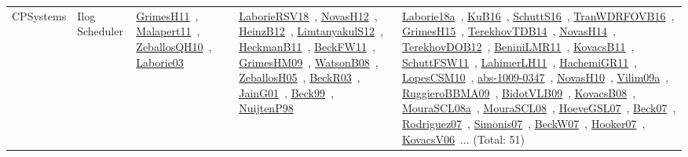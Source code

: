 {\begin{longtable}{lp{3cm}>{\raggedright\arraybackslash}p{6cm}>{\raggedright\arraybackslash}p{6cm}>{\raggedright\arraybackslash}p{8cm}}
CPSystems & Ilog Scheduler & \href{works/GrimesH11.pdf}{GrimesH11}~\cite{GrimesH11}, \href{works/Malapert11.pdf}{Malapert11}~\cite{Malapert11}, \href{works/ZeballosQH10.pdf}{ZeballosQH10}~\cite{ZeballosQH10}, \href{works/Laborie03.pdf}{Laborie03}~\cite{Laborie03} & \href{works/LaborieRSV18.pdf}{LaborieRSV18}~\cite{LaborieRSV18}, \href{works/NovasH12.pdf}{NovasH12}~\cite{NovasH12}, \href{works/HeinzB12.pdf}{HeinzB12}~\cite{HeinzB12}, \href{works/LimtanyakulS12.pdf}{LimtanyakulS12}~\cite{LimtanyakulS12}, \href{works/HeckmanB11.pdf}{HeckmanB11}~\cite{HeckmanB11}, \href{works/BeckFW11.pdf}{BeckFW11}~\cite{BeckFW11}, \href{works/GrimesHM09.pdf}{GrimesHM09}~\cite{GrimesHM09}, \href{works/WatsonB08.pdf}{WatsonB08}~\cite{WatsonB08}, \href{works/ZeballosH05.pdf}{ZeballosH05}~\cite{ZeballosH05}, \href{works/BeckR03.pdf}{BeckR03}~\cite{BeckR03}, \href{works/JainG01.pdf}{JainG01}~\cite{JainG01}, \href{works/Beck99.pdf}{Beck99}~\cite{Beck99}, \href{works/NuijtenP98.pdf}{NuijtenP98}~\cite{NuijtenP98} & \href{works/Laborie18a.pdf}{Laborie18a}~\cite{Laborie18a}, \href{works/KuB16.pdf}{KuB16}~\cite{KuB16}, \href{works/SchuttS16.pdf}{SchuttS16}~\cite{SchuttS16}, \href{works/TranWDRFOVB16.pdf}{TranWDRFOVB16}~\cite{TranWDRFOVB16}, \href{works/GrimesH15.pdf}{GrimesH15}~\cite{GrimesH15}, \href{works/TerekhovTDB14.pdf}{TerekhovTDB14}~\cite{TerekhovTDB14}, \href{works/NovasH14.pdf}{NovasH14}~\cite{NovasH14}, \href{works/TerekhovDOB12.pdf}{TerekhovDOB12}~\cite{TerekhovDOB12}, \href{works/BeniniLMR11.pdf}{BeniniLMR11}~\cite{BeniniLMR11}, \href{works/KovacsB11.pdf}{KovacsB11}~\cite{KovacsB11}, \href{works/SchuttFSW11.pdf}{SchuttFSW11}~\cite{SchuttFSW11}, \href{works/LahimerLH11.pdf}{LahimerLH11}~\cite{LahimerLH11}, \href{works/HachemiGR11.pdf}{HachemiGR11}~\cite{HachemiGR11}, \href{works/LopesCSM10.pdf}{LopesCSM10}~\cite{LopesCSM10}, \href{works/abs-1009-0347.pdf}{abs-1009-0347}~\cite{abs-1009-0347}, \href{works/NovasH10.pdf}{NovasH10}~\cite{NovasH10}, \href{works/Vilim09a.pdf}{Vilim09a}~\cite{Vilim09a}, \href{works/RuggieroBBMA09.pdf}{RuggieroBBMA09}~\cite{RuggieroBBMA09}, \href{works/BidotVLB09.pdf}{BidotVLB09}~\cite{BidotVLB09}, \href{works/KovacsB08.pdf}{KovacsB08}~\cite{KovacsB08}, \href{works/MouraSCL08a.pdf}{MouraSCL08a}~\cite{MouraSCL08a}, \href{works/MouraSCL08.pdf}{MouraSCL08}~\cite{MouraSCL08}, \href{works/HoeveGSL07.pdf}{HoeveGSL07}~\cite{HoeveGSL07}, \href{works/Beck07.pdf}{Beck07}~\cite{Beck07}, \href{works/Rodriguez07.pdf}{Rodriguez07}~\cite{Rodriguez07}, \href{works/Simonis07.pdf}{Simonis07}~\cite{Simonis07}, \href{works/BeckW07.pdf}{BeckW07}~\cite{BeckW07}, \href{works/Hooker07.pdf}{Hooker07}~\cite{Hooker07}, \href{works/KovacsV06.pdf}{KovacsV06}~\cite{KovacsV06}... (Total: 51)\\

\end{longtable}}
